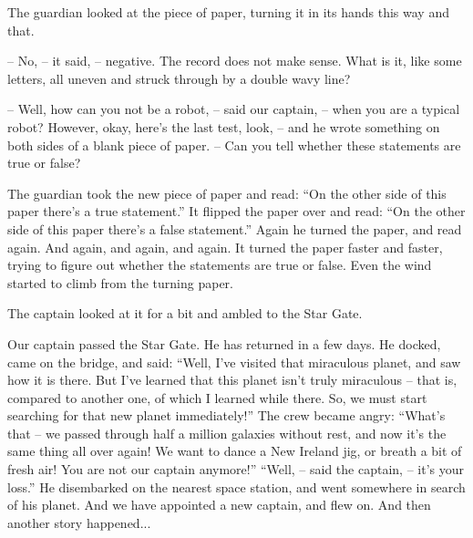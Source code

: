 \documentclass[ebook,oneside,final,openright]{memoir}
\begin{document}
The guardian looked at the piece of paper, turning it in its hands this way and that.\par
– No, – it said, – negative. The record does not make sense. What is it, like some letters, all uneven and struck through by a double wavy line?\par
– Well, how can you not be a robot, – said our captain, – when you are a typical robot? However, okay, here’s the last test, look, – and he wrote something on both sides of a blank piece of paper. – Can you tell whether these statements are true or false?\par
\par
The guardian took the new piece of paper and read: “On the other side of this paper there’s a true statement.” It flipped the paper over and read: “On the other side of this paper there’s a false statement.” Again he turned the paper, and read again. And again, and again, and again. It turned the paper faster and faster, trying to figure out whether the statements are true or false. Even the wind started to climb from the turning paper.\par
\par
The captain looked at it for a bit and ambled to the Star Gate.\par
Our captain passed the Star Gate. He has returned in a few days. He docked, came on the bridge, and said: “Well, I’ve visited that miraculous planet, and saw how it is there. But I’ve learned that this planet isn’t truly miraculous – that is, compared to another one, of which I learned while there. So, we must start searching for that new planet immediately!” The crew became angry: “What’s that – we passed through half a million galaxies without rest, and now it’s the same thing all over again! We want to dance a New Ireland jig, or breath a bit of fresh air! You are not our captain anymore!” “Well, – said the captain, – it’s your loss.” He disembarked on the nearest space station, and went somewhere in search of his planet. And we have appointed a new captain, and flew on. And then another story happened...
\end{document}
